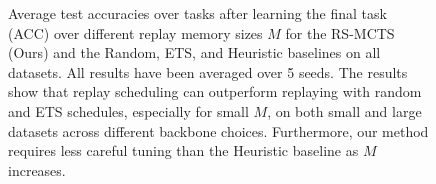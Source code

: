 
\begin{figure}[t]
  \centering
  \setlength{\figwidth}{0.35\textwidth}
  \setlength{\figheight}{.16\textheight}%
  
  \vspace{-3mm}
  \caption{Average test accuracies over tasks after learning the final task (ACC) over different replay memory sizes $M$ for the RS-MCTS (Ours) and the Random, ETS, and Heuristic baselines on all datasets.
  All results have been averaged over 5 seeds. The results show that replay scheduling can outperform replaying with random and ETS schedules, %
  especially for small $M$, on both small and large datasets across different backbone choices. Furthermore, our method requires less careful tuning than the Heuristic baseline as $M$ increases.
  }
  \vspace{-3mm}
  \label{fig:acc_over_replay_memory_size}
\end{figure}

